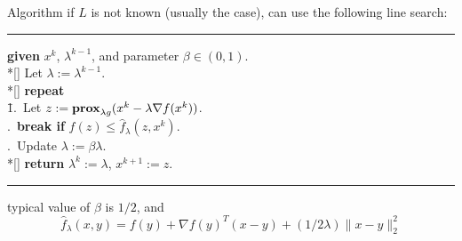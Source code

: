 \documentclass[10pt,mathserif]{beamer}
\begin{document}
\begin{frame}{Algorithm}
    if $L$ is not known (usually the case), can use the following line search:
    \noindent\rule[-5pt]{\textwidth}{0.4pt}
    {\footnotesize
    \begin{tabbing}
        {\bf given} $x^k$, $\lambda^{k-1}$, and parameter $\beta \in (0,1)$. \\*[\smallskipamount]
        Let $\lambda := \lambda^{k-1}$. \\*[\smallskipamount]
        {\bf repeat} \\
        \qquad \= 1.\ Let $z := \mathbf{prox}_{\lambda g}(x^{k} - \lambda \nabla f(x^{k}))$. \\
        .\ {\bf break if} $f(z) \leq \hat{f}_{\lambda}(z, x^{k})$. \\
        .\ Update $\lambda := \beta \lambda$. \\*[\smallskipamount]
        {\bf return} $\lambda^{k} := \lambda$, $x^{k+1}:=z$.
    \end{tabbing}}
    \noindent\rule[10pt]{\textwidth}{0.4pt}

    typical value of $\beta$ is $1/2$, and 
    \[
    \hat{f}_\lambda(x,y) = f(y) + \nabla f(y)^T (x - y) + 
    (1/2\lambda)\|x - y\|_2^2
    \]
\end{frame}
\end{document}
